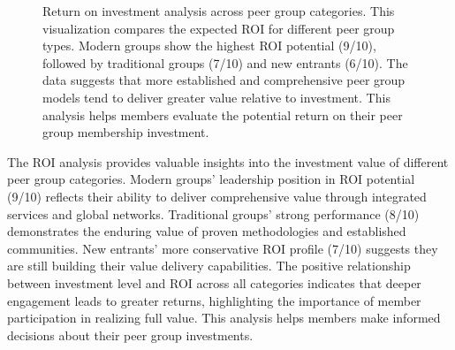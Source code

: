 \documentclass[conference]{IEEEtran}
\begin{document}
\begin{figure}[t]
\centering
{}
\caption{Return on investment analysis across peer group categories. 
This visualization compares the expected ROI for different peer group types. 
Modern groups show the highest ROI potential (9/10), followed by traditional groups (7/10) 
and new entrants (6/10). The data suggests that more established and comprehensive peer 
group models tend to deliver greater value relative to investment. This analysis helps 
members evaluate the potential return on their peer group membership investment.}
\label{fig:roi_analysis}
\end{figure}

The ROI analysis provides valuable insights into the investment value of different peer group categories. Modern groups' leadership position in ROI potential (9/10) reflects their ability to deliver comprehensive value through integrated services and global networks. Traditional groups' strong performance (8/10) demonstrates the enduring value of proven methodologies and established communities. New entrants' more conservative ROI profile (7/10) suggests they are still building their value delivery capabilities. The positive relationship between investment level and ROI across all categories indicates that deeper engagement leads to greater returns, highlighting the importance of member participation in realizing full value. This analysis helps members make informed decisions about their peer group investments.
\end{document}
